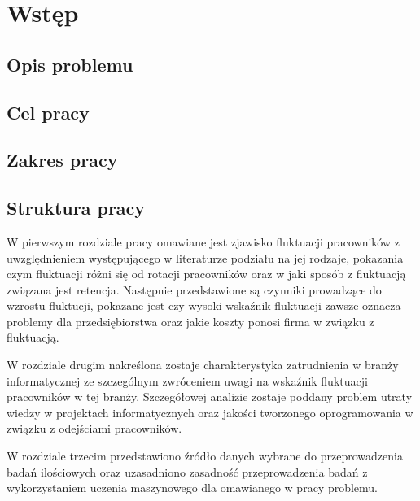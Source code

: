 
\chapter*{Wstęp}\label{ch:admission}

\section*{Opis problemu}\label{sec:admission:problem-description}

\section*{Cel pracy}\label{sec:admission:thesis-goal}


\section*{Zakres pracy}\label{sec:admission:scope-of-work}


\section*{Struktura pracy}\label{sec:admission:thesis-structure}

W pierwszym rozdziale pracy omawiane jest zjawisko fluktuacji pracowników z uwzględnieniem występującego w literaturze podziału na jej rodzaje,
pokazania czym fluktuacji różni się od rotacji pracowników oraz w jaki sposób z fluktuacją związana jest retencja.
Następnie przedstawione są czynniki prowadzące do wzrostu fluktucji, pokazane jest czy wysoki wskaźnik fluktuacji zawsze oznacza problemy dla przedsiębiorstwa
oraz jakie koszty ponosi firma w związku z fluktuacją.

W rozdziale drugim nakreślona zostaje charakterystyka zatrudnienia w branży informatycznej ze szczególnym zwróceniem uwagi na wskaźnik fluktuacji pracowników w tej branży.
Szczegółowej analizie zostaje poddany problem utraty wiedzy w projektach informatycznych oraz jakości tworzonego oprogramowania w związku z odejściami pracowników.

W rozdziale trzecim przedstawiono źródło danych wybrane do przeprowadzenia badań ilościowych
oraz uzasadniono zasadność przeprowadzenia badań z wykorzystaniem uczenia maszynowego dla omawianego w pracy problemu.

\thispagestyle{normal}
